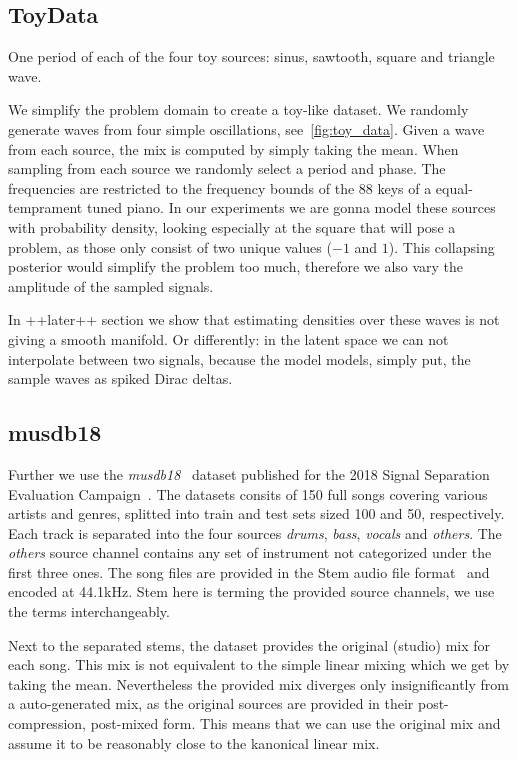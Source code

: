 \subsection{ToyData}
\begin{marginfigure}
    \resizebox{\textwidth}{!}{%
    }%
    \caption{One period of each of the four toy sources: sinus, sawtooth, square and triangle wave.}%
    \label{fig:toy_data}
\end{marginfigure}

We simplify the problem domain to create a toy-like dataset. We randomly generate waves from four simple oscillations, see~\cref{fig:toy_data}. Given a wave from each source, the mix is computed by simply taking the mean. When sampling from each source we randomly select a period and phase. The frequencies are restricted to the frequency bounds of the 88 keys of a equal-temprament tuned piano. In our experiments we are gonna model these sources with probability density, looking especially at the square that will pose a problem, as those only consist of two unique values (\(-1\) and \(1\)). This collapsing posterior would simplify the problem too much, therefore we also vary the amplitude of the sampled signals.

In ++later++ section we show that estimating densities over these waves is not giving a smooth manifold. Or differently: in the latent space we can not interpolate between two signals, because the model models, simply put, the sample waves as spiked Dirac deltas.


\subsection{musdb18}
Further we use the \emph{musdb18}~\cite{rafiiMUSDB182017} dataset published for the 2018 Signal Separation Evaluation Campaign~\cite{stoter20182018}. The datasets consits of 150 full songs covering various artists and genres, splitted into train and test sets sized 100 and 50, respectively. Each track is separated into the four sources \emph{drums}, \emph{bass}, \emph{vocals} and \emph{others}. The \emph{others} source channel contains any set of instrument not categorized under the first three ones. The song files are provided in the Stem audio file format~\cite{nativeinstrumentsStem} and encoded at 44.1kHz. Stem here is terming the provided source channels, we use the terms interchangeably.

Next to the separated stems, the dataset provides the original (studio) mix for each song. This mix is not equivalent to the simple linear mixing which we get by taking the mean. Nevertheless the provided mix diverges only insignificantly from a auto-generated mix, as the original sources are provided in their post-compression, post-mixed form. This means that we can use the original mix and assume it to be reasonably close to the kanonical linear mix.

